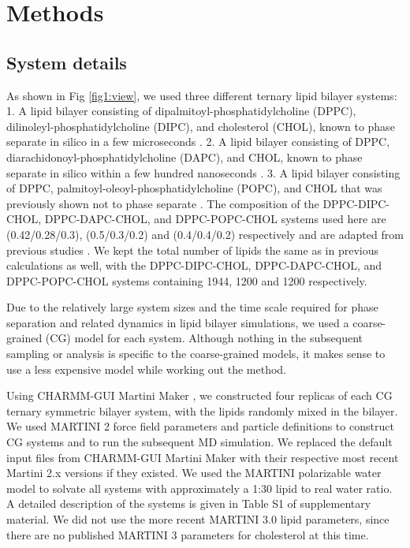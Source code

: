 \documentclass{biophys-new}
\begin{document}
\section*{Methods}

\subsection*{System details}

As shown in Fig \ref{fig1:view}, we used three different ternary lipid bilayer systems:
1. A lipid bilayer consisting of dipalmitoyl-phosphatidylcholine (DPPC), dilinoleyl-phosphatidylcholine (DIPC), and cholesterol (CHOL), known to phase separate in silico in a few microseconds \cite{Risselada2008, Schafer2010, Janosi2012, Doma2012, Jong2013, Liu2020, Su2020}.
2. A lipid bilayer consisting of DPPC, diarachidonoyl-phosphatidylcholine (DAPC), and CHOL, known to phase separate in silico within a few hundred nanoseconds \cite{Lin2016, Lin2019, Davis2013a}.
3. A lipid bilayer consisting of DPPC, palmitoyl-oleoyl-phosphatidylcholine (POPC), and CHOL that was previously shown not to phase separate \cite{Veatch2003,Davis2013a}.
The composition of the DPPC-DIPC-CHOL, DPPC-DAPC-CHOL, and DPPC-POPC-CHOL systems used here are (0.42/0.28/0.3), (0.5/0.3/0.2) and (0.4/0.4/0.2) respectively and are adapted from previous studies \cite{Risselada2008, Lin2016, Davis2013a}.
We kept the total number of lipids the same as in previous calculations as well, with the  DPPC-DIPC-CHOL, DPPC-DAPC-CHOL, and DPPC-POPC-CHOL systems containing 1944, 1200 and 1200 respectively. 

Due to the relatively large system sizes and the time scale required for phase separation and related dynamics in lipid bilayer simulations, we used a coarse-grained (CG) model for each system. Although nothing in the subsequent sampling or analysis is specific to the coarse-grained models, it makes sense to use a less expensive model while working out the method.
 
Using CHARMM-GUI Martini Maker \cite{Qi2015}, we constructed four replicas of each CG ternary symmetric bilayer system, with the lipids randomly mixed in the bilayer.
We used MARTINI 2 force field parameters and particle definitions\cite{Marrink2007, DeJong2013} to construct CG systems and to run the subsequent MD simulation.
We replaced the default input files from CHARMM-GUI Martini Maker with their respective most recent Martini 2.x versions if they existed.
We used the MARTINI polarizable water model\cite{Yesylevskyy2010} to solvate all systems with approximately a 1:30 lipid to real water ratio.
A detailed description of the systems is given in Table S1 of supplementary material.
We did not use the more recent MARTINI 3.0 lipid parameters, since there are no published MARTINI 3 parameters for cholesterol at this time.
\end{document}
